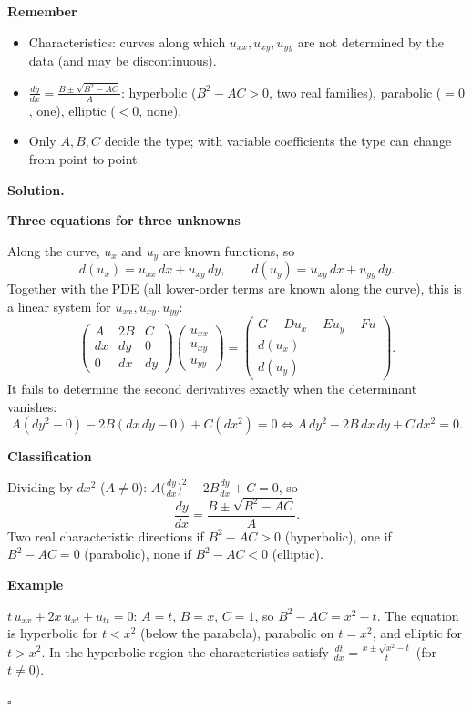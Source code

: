 \documentclass[11pt,a4paper]{article}
\newenvironment{rem}
  {\begin{remember}\noindent\textbf{Remember}\par\nobreak\vspace{-0.3em}}
  {\end{remember}}
\newenvironment{solution}
  {\par\noindent\textbf{Solution.}\par\nobreak}
  {\par\nobreak\noindent\hfill\(\square\)\par}
\newcommand{\step}[1]{\par\addvspace{0.5em}\noindent\textbf{#1}\par\nobreak}
\begin{document}
\begin{rem}
\begin{itemize}
  \item Characteristics: curves along which \(u_{xx},u_{xy},u_{yy}\) are
    not determined by the data (and may be discontinuous).
  \item \(\frac{dy}{dx}=\frac{B\pm\sqrt{B^2-AC}}A\): hyperbolic
    (\(B^2-AC>0\), two real families), parabolic (\(=0\), one),
    elliptic (\(<0\), none).
  \item Only \(A,B,C\) decide the type; with variable coefficients
    the type can change from point to point.
\end{itemize}
\end{rem}

\begin{solution}
\step{Three equations for three unknowns}
Along the curve, \(u_x\) and \(u_y\) are known functions, so
\[
  d(u_x)=u_{xx}\,dx+u_{xy}\,dy,\qquad
  d(u_y)=u_{xy}\,dx+u_{yy}\,dy .
\]
Together with the PDE (all lower-order terms are known along the
curve), this is a linear system for \(u_{xx},u_{xy},u_{yy}\):
\[
  \begin{pmatrix}A&2B&C\\ dx&dy&0\\ 0&dx&dy\end{pmatrix}
  \begin{pmatrix}u_{xx}\\u_{xy}\\u_{yy}\end{pmatrix}
  =\begin{pmatrix}G-Du_x-Eu_y-Fu\\ d(u_x)\\ d(u_y)\end{pmatrix}.
\]
It fails to determine the second derivatives exactly when the
determinant vanishes:
\[
  A(dy^2-0)-2B(dx\,dy-0)+C(dx^2)=0
  \iff A\,dy^2-2B\,dx\,dy+C\,dx^2=0 .
\]

\step{Classification}
Dividing by \(dx^2\) (\(A\ne0\)):
\(A\bigl(\frac{dy}{dx}\bigr)^2-2B\frac{dy}{dx}+C=0\), so
\[
  \frac{dy}{dx}=\frac{B\pm\sqrt{B^2-AC}}A .
\]
Two real characteristic directions if \(B^2-AC>0\) (hyperbolic), one
if \(B^2-AC=0\) (parabolic), none if \(B^2-AC<0\) (elliptic).

\step{Example}
\(t\,u_{xx}+2x\,u_{xt}+u_{tt}=0\): \(A=t\), \(B=x\), \(C=1\), so
\(B^2-AC=x^2-t\).  The equation is hyperbolic for \(t<x^2\) (below the
parabola), parabolic on \(t=x^2\), and elliptic for \(t>x^2\).  In the
hyperbolic region the characteristics satisfy
\(\frac{dt}{dx}=\frac{x\pm\sqrt{x^2-t}}{t}\) (for \(t\ne0\)).
\end{solution}
\end{document}
